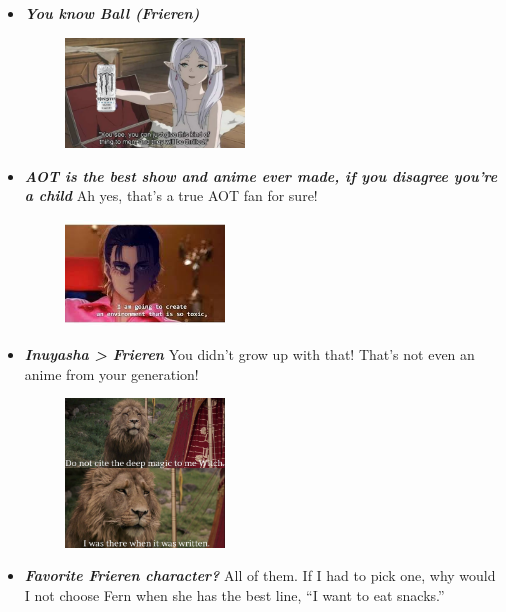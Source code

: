 \documentclass[11pt,letterpaper]{article}
\begin{document}
\begin{itemize}
\item {\bfseries\itshape You know Ball (Frieren)} 
	\begin{figure}[H]
	\centering
	\includegraphics[width=0.45\textwidth]{images/frieren.png}
	\end{figure}

\item {\bfseries\itshape AOT is the best show and anime ever made, if you disagree you're a child} Ah yes, that's a true AOT fan for sure!
	\begin{figure}[H]
	\centering
	\includegraphics[width=0.40\textwidth]{images/aot.jpeg}
	\end{figure}

\newpage

\item {\bfseries\itshape Inuyasha > Frieren} You didn't grow up with that! That's not even an anime from your generation! 
	\begin{figure}[H]
	\centering
	\includegraphics[width=0.40\textwidth]{images/magic.png}
	\end{figure}

\item {\bfseries\itshape Favorite Frieren character?} All of them. If I had to pick one, why would I not choose Fern when she has the best line, ``I want to eat snacks.'' 
\end{itemize}
\end{document}
